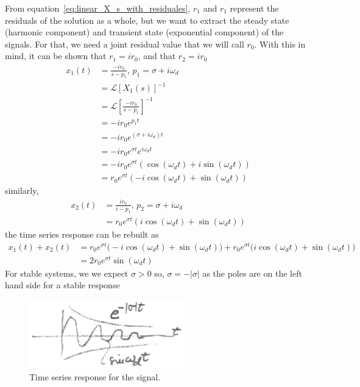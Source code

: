 \documentclass[12pt,letter]{article}
\numberwithin{ex}{section} %
\numberwithin{re}{section} %
\newcommand{\Laplace}[1]{\ensuremath{\mathcal{L}{\left[#1\right]}}}
\numberwithin{equation}{section}	%
\begin{document}
From equation~\ref{eq:linear_X_s_with_residuales}, $r_1$ and $r_1$ represent the residuals of the solution as a whole, but we want to extract the steady state (harmonic component) and transient state (exponential component) of the signals. For that, we need a joint residual value that we will call $r_0$. With this in mind, it can be shown that $r_1 = i r_0$, and that $r_2 = ir_0$
\begin{align}
x_1(t) &= \frac{-i r_0}{s-p_1}\text{, } p_1 = \sigma +i \omega_d  \\
&= \Laplace{X_1(s)}^{-1} \nonumber \\
&= \Laplace{\frac{-i r_0}{s-p_1}}^{-1} \nonumber \\
&= -i r_0 e^{p_1 t}  \nonumber \\
&= -i r_0 e^{(\sigma + i \omega_d) t}  \nonumber \\
&= -i r_0 e^{\sigma t}  e^{i \omega_d t}  \nonumber \\
&= -i r_0 e^{\sigma t}(\cos(\omega_d t) + i \sin(\omega_d t ))  \nonumber \\
&= r_0 e^{\sigma t}(-i \cos(\omega_d t) + \sin(\omega_d t )) \nonumber
\end{align}
similarly,
\begin{align}
x_2(t) &= \frac{i r_0}{i-p_1}\text{, } p_2 = \sigma +i \omega_d \\ 
&= r_0 e^{\sigma t}(i \cos(\omega_d t) + \sin(\omega_d t )) \nonumber 
\end{align}
the time series response can be rebuilt as 
\begin{align}
x_1(t) + x_2(t) &= r_0 e^{\sigma t}\big(-i \cos(\omega_d t) + \sin(\omega_d t ) \big) + r_0 e^{\sigma t}\big(i \cos(\omega_d t) + \sin(\omega_d t ) \big) \\ 
&= 2 r_0 e^{\sigma t} \sin (\omega_d t) \nonumber 
\end{align}
For stable systems, we we expect $\sigma > 0$ so, $\sigma = -|\sigma|$ as the poles are on the left hand side for a stable response
	\begin{figure}[H]
		\centering
		\includegraphics[width=0.6\textwidth]{../figures/time_series_response_inverse_laplace.png}
		\caption{Time series response for the signal.}
	\end{figure}
\end{document}
